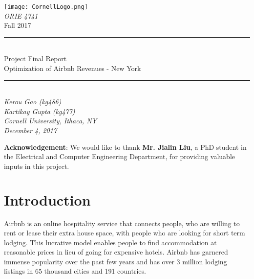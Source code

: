 \documentclass[12pt]{article}
\begin{document}
\rmfamily %

\begin{titlepage}
\begin{center}
\texttt{[image: CornellLogo.png]}\\[0.2cm]
\textsl{\LARGE ORIE 4741 }\\[0.5cm]
{\huge Fall 2017}\\[0.2cm]
\centering
\rule{\linewidth}{0.5mm}\\[0.4cm]
{\LARGE Project Final Report \\[0.4cm] Optimization of Airbnb Revenues - New York}
\rule{\linewidth}{0.5mm}\\[0.4cm]
\textsl{\Large  Kerou Gao (kg486)\\Kartikay Gupta (kg477)\\}
\vspace{5mm}
\textsl{\Large Cornell University, Ithaca, NY}\\[0.2cm]

\textsl{\Large{December 4, 2017}}\\[9cm]

\end{center}

\noindent \textbf{Acknowledgement}: We would like to thank \textbf{Mr. Jialin Liu}, a PhD student in the Electrical and Computer Engineering Department, for providing valuable inputs in this project.

\end{titlepage}

\pagestyle{fancy}
\fancyhf{}
\setlength{\headheight}{50pt}
\renewcommand{\headrulewidth}{0.4pt}
\renewcommand{\footrulewidth}{0.4pt}
\cfoot{\thepage}



\section*{Introduction}
\noindent Airbnb is an online hospitality service that connects people, who are willing to rent or lease their extra house space, with people who are looking for short term lodging. This lucrative model enables people to find accommodation at reasonable prices in lieu of going for expensive hotels. Airbnb has garnered immense popularity over the past few years and has over 3 million lodging listings in 65 thousand cities and 191 countries. 
\end{document}
